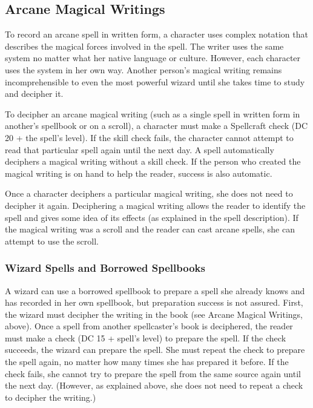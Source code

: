 \subsection{Arcane Magical Writings}

To record an arcane spell in written form, a character uses complex notation that 
describes the magical forces involved in the spell. The writer uses the same system 
no matter what her native language or culture. However, each character uses the 
system in her own way. Another person's magical writing remains incomprehensible 
to even the most powerful wizard until she takes time to study and decipher it.

To decipher an arcane magical writing (such as a single spell in written form in 
another's spellbook or on a scroll), a character must make a Spellcraft check (DC 
20 + the spell's level). If the skill check fails, the character cannot attempt 
to read that particular spell again until the next day. A  spell 
automatically deciphers a magical writing without a skill check. If the person 
who created the magical writing is on hand to help the reader, success is also 
automatic.

Once a character deciphers a particular magical writing, she does not need to decipher 
it again. Deciphering a magical writing allows the reader to identify the spell 
and gives some idea of its effects (as explained in the spell description). If 
the magical writing was a scroll and the reader can cast arcane spells, she can 
attempt to use the scroll.

\subsubsection{Wizard Spells and Borrowed Spellbooks}

A wizard can use a borrowed spellbook to prepare a spell she already knows and 
has recorded in her own spellbook, but preparation success is not assured. First, 
the wizard must decipher the writing in the book (see Arcane Magical Writings, 
above). Once a spell from another spellcaster's book is deciphered, the reader 
must make a  check (DC 15 + spell's level) to prepare the spell. If the 
check succeeds, the wizard can prepare the spell. She must repeat the check to 
prepare the spell again, no matter how many times she has prepared it before. If 
the check fails, she cannot try to prepare the spell from the same source again 
until the next day. (However, as explained above, she does not need to repeat a 
check to decipher the writing.)

